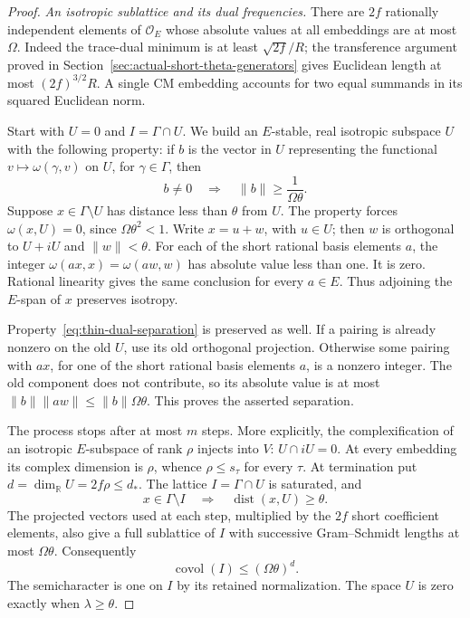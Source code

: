 \begin{proof}
\emph{An isotropic sublattice and its dual frequencies.}
There are $2f$ rationally independent elements of
$\mathcal O_E$ whose absolute values at all embeddings are at
most $\Omega$.  Indeed the trace-dual minimum is at least
$\sqrt{2f}/R$; the transference argument proved in
Section~\ref{sec:actual-short-theta-generators} gives Euclidean
length at most $(2f)^{3/2}R$.  A single CM embedding accounts for
two equal summands in its squared Euclidean norm.

Start with $U=0$ and $I=\Gamma\cap U$.  We build an
$E$-stable, real isotropic subspace $U$ with the following property:
if $b$ is the vector in $U$ representing the functional
$v\mapsto\omega(\gamma,v)$ on $U$, for $\gamma\in\Gamma$,
then
\begin{equation}\label{eq:thin-dual-separation}
             b\ne0\quad\Longrightarrow\quad
                         \|b\|\ge\frac1{\Omega\theta}.
\end{equation}
Suppose $x\in\Gamma\setminus U$ has distance less than
$\theta$ from $U$.  The property forces $\omega(x,U)=0$,
since $\Omega\theta^2<1$.  Write $x=u+w$, with $u\in U$;
then $w$ is orthogonal to $U+iU$ and $\|w\|<\theta$.
For each of the short rational basis elements $a$, the integer
$\omega(ax,x)=\omega(aw,w)$ has absolute value less than one.
It is zero.  Rational linearity gives the same conclusion for
every $a\in E$.  Thus adjoining the $E$-span of $x$ preserves
isotropy.

Property~\eqref{eq:thin-dual-separation} is preserved as well.
If a pairing is already nonzero on the old $U$, use its old
orthogonal projection.  Otherwise some pairing with $ax$, for
one of the short rational basis elements $a$, is a nonzero
integer.  The old component does not contribute, so its absolute
value is at most $\|b\|\|aw\|\le\|b\|\Omega\theta$.
This proves the asserted separation.

The process stops after at most $m$ steps.  More explicitly, the
complexification of an isotropic $E$-subspace of rank $\rho$
injects into $V$: $U\cap iU=0$.  At every embedding its
complex dimension is $\rho$, whence $\rho\le s_\tau$ for
every $\tau$.  At termination put $d=\dim_{\mathbb R}U=2f\rho
\le d_*$.  The lattice $I=\Gamma\cap U$ is saturated, and
\begin{equation}\label{eq:thin-quotient-separation}
 x\in\Gamma\setminus I\quad\Longrightarrow\quad
                         \operatorname{dist}(x,U)\ge\theta.
\end{equation}
The projected vectors used at each step, multiplied by the $2f$
short coefficient elements, also give a full sublattice of $I$
with successive Gram--Schmidt lengths at most $\Omega\theta$.
Consequently
\begin{equation}\label{eq:thin-isotropic-covolume}
                         \operatorname{covol}(I)
                                      \le(\Omega\theta)^d.
\end{equation}
The semicharacter is one on $I$ by its retained normalization.
The space $U$ is zero exactly when $\lambda\ge\theta$.


\end{proof}
